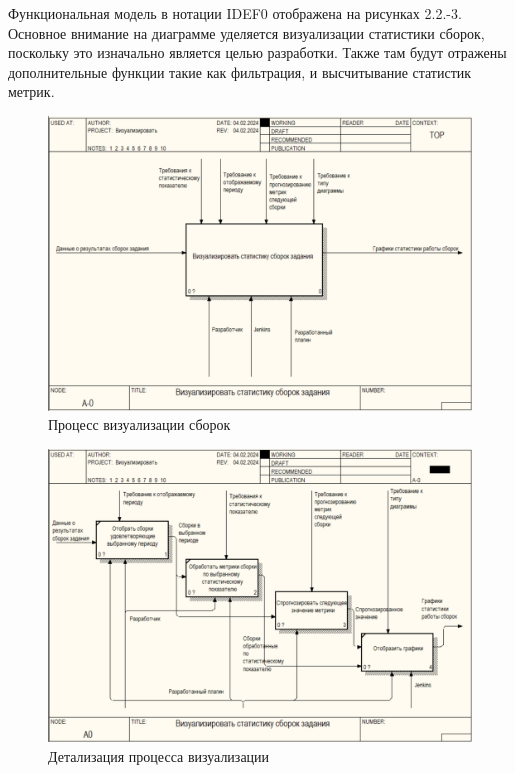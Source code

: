 Функциональная модель в нотации IDEF0 отображена на рисунках 2.2.-3. Основное внимание на диаграмме уделяется визуализации статистики сборок, поскольку это изначально является целью разработки. Также там будут отражены дополнительные функции такие как фильтрация, и высчитывание статистик метрик.

\begin{figure}[ht!] 
	\center
	\includegraphics [scale=0.7] {my_folder/images//er1}
	\caption{Процесс визуализации сборок} 
	\label{fig:er1}  
\end{figure}

\begin{figure}[ht!] 
	\center
	\includegraphics [scale=0.7] {my_folder/images//er2}
	\caption{Детализация процесса визуализации} 
	\label{fig:er2}  
\end{figure}

